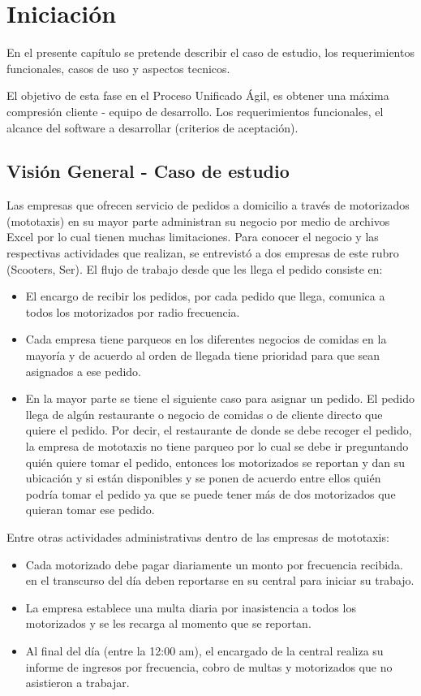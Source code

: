 \chapter{Iniciación}
\noindent En el presente capítulo se pretende describir el caso de estudio, los requerimientos funcionales, casos de uso y aspectos tecnicos.

\noindent El objetivo de esta fase en el Proceso Unificado Ágil, es obtener una máxima compresión cliente - equipo de desarrollo. Los requerimientos funcionales, el alcance del software a desarrollar (criterios de aceptación).

\section {Visión General - Caso de estudio}
\noindent Las empresas que ofrecen servicio de pedidos a domicilio a través de motorizados (mototaxis) en su mayor parte administran su negocio por medio de archivos Excel por lo cual tienen muchas limitaciones.
Para conocer el negocio y las respectivas actividades que realizan, se entrevistó a dos empresas de este rubro (Scooters, Ser). El flujo de trabajo desde que les llega el pedido consiste en:
\begin{itemize}
\item El encargo de recibir los pedidos, por cada pedido que llega, comunica a todos los motorizados por radio frecuencia.
\item Cada empresa tiene parqueos en los diferentes negocios de comidas en la mayoría y de acuerdo al orden de llegada tiene prioridad para que sean asignados a ese pedido.
\item En la mayor parte se tiene el siguiente caso para asignar un pedido. El pedido llega de algún restaurante o negocio de comidas o de cliente directo que quiere el pedido. Por decir, el restaurante de donde se debe recoger el pedido, la empresa de mototaxis no tiene parqueo por lo cual se debe ir preguntando quién quiere tomar el pedido, entonces los motorizados se reportan y dan su ubicación y si están disponibles y se ponen de acuerdo entre ellos quién podría tomar el pedido ya que se puede tener más de dos motorizados que quieran tomar ese pedido.
\end{itemize}
\indent Entre otras actividades administrativas dentro de las empresas de mototaxis:
\begin{itemize}
\item Cada motorizado debe pagar diariamente un monto por frecuencia recibida. en el transcurso del día deben reportarse en su central para iniciar su trabajo.
\item La empresa establece una multa diaria por inasistencia a todos los motorizados y se les recarga al momento que se reportan.
\item Al final del día (entre la 12:00 am), el encargado de la central realiza su informe de ingresos por frecuencia, cobro de multas y motorizados que no asistieron a trabajar.
\end{itemize}
